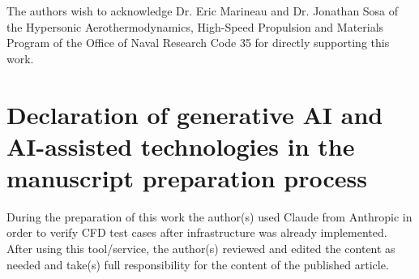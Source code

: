 \documentclass[preprint,12pt, a4paper]{elsarticle}
\begin{document}
The authors wish to acknowledge Dr. Eric Marineau and Dr. Jonathan Sosa of the Hypersonic Aerothermodynamics, High-Speed Propulsion and Materials Program of the Office of Naval Research Code 35 for directly supporting this work.

\section*{Declaration of generative AI and AI-assisted technologies in the manuscript preparation process}
During the preparation of this work the author(s) used Claude from Anthropic in order to verify CFD test cases after infrastructure was already implemented. 
After using this tool/service, the author(s) reviewed and edited the content as needed and take(s) full responsibility for the content of the published article.


 

\end{document}
